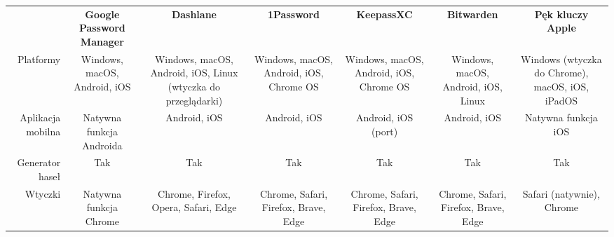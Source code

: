 \begin{table}[]
\begin{tabular}{rcccccc}
\multicolumn{1}{l}{}                                                      & \textbf{Google Password Manager} & \textbf{Dashlane}                                                                                    & \textbf{1Password}                                                                                       & \textbf{KeepassXC}                      & \textbf{Bitwarden}                                                                                                                 & \textbf{Pęk kluczy Apple}                       \\
Platformy                                                                 & Windows, macOS, Android, iOS     & Windows, macOS, Android, iOS, Linux (wtyczka do przeglądarki)                                        & Windows, macOS, Android, iOS, Chrome OS                                                                  & Windows, macOS, Android, iOS, Chrome OS & Windows, macOS, Android, iOS, Linux                                                                                                & Windows (wtyczka do Chrome), macOS, iOS, iPadOS \\
Aplikacja mobilna                                                         & Natywna funkcja Androida         & Android, iOS                                                                                         & Android, iOS                                                                                             & Android, iOS (port)                     & Android, iOS                                                                                                                       & Natywna funkcja iOS                             \\
Generator haseł                                                           & Tak                              & Tak                                                                                                  & Tak                                                                                                      & Tak                                     & Tak                                                                                                                                & Tak                                             \\
Wtyczki                                                                   & Natywna funkcja Chrome           & Chrome, Firefox, Opera, Safari, Edge                                                                 & Chrome, Safari, Firefox, Brave, Edge                                                                     & Chrome, Safari, Firefox, Brave, Edge    & Chrome, Safari, Firefox, Brave, Edge                                                                                               & Safari (natywnie), Chrome                       \\

\end{tabular}
\end{table}
